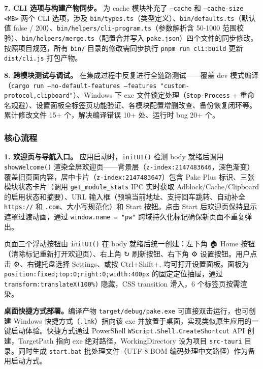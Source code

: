 \documentclass[12pt,a4paper]{ctexart}
\begin{document}
\textbf{7. CLI 选项与构建产物同步。}
为 cache 模块补充了 \texttt{--cache} 和 \texttt{--cache-size <MB>} 两个 CLI 选项，涉及 \texttt{bin/types.ts}（类型定义）、\texttt{bin/defaults.ts}（默认值 false / 200）、\texttt{bin/helpers/cli-program.ts}（参数解析含 50-1000 范围校验）、\texttt{bin/helpers/merge.ts}（配置合并写入 \texttt{pake.json}）四个文件的同步修改。按照项目规范，所有 \texttt{bin/} 目录的修改需同步执行 \texttt{pnpm run cli:build} 更新 \texttt{dist/cli.js} 打包产物。

\textbf{8. 跨模块测试与调试。}
在集成过程中反复进行全链路测试——覆盖 dev 模式编译（\texttt{cargo run --no-default-features --features "custom-protocol,clipboard"}）、Windows 下 exe 文件锁定处理（\texttt{Stop-Process} + 重命名规避）、设置面板全标签页功能验证、各模块配置增删改查、备份恢复闭环等。累计修改文件 15+ 个，解决编译错误 10+ 处、运行时 bug 20+ 个。

\subsubsection{核心流程}

\textbf{1. 欢迎页与导航入口。}
应用启动时，\texttt{initUI()} 检测 body 就绪后调用 \texttt{showWelcome()} 渲染全屏欢迎页——背景层（\texttt{z-index:2147483646}，深色渐变）覆盖旧页面内容，居中卡片（\texttt{z-index:2147483647}）包含 Pake Plus 标识、三张模块状态卡片（调用 \texttt{get\_module\_stats} IPC 实时获取 Adblock/Cache/Clipboard 的启用状态和摘要）、URL 输入框（预填当前地址、支持回车跳转、自动补全 \texttt{https://} 和 \texttt{.com}、大小写规范化）和 Start 按钮。点击 Start 后欢迎页保持显示遮罩过渡动画，通过 \texttt{window.name = "pw"} 跨域持久化标记确保新页面不重复弹出。

页面三个浮动按钮由 \texttt{initUI()} 在 body 就绪后统一创建：左下角 🏠 Home 按钮（清除标记重新打开欢迎页）、右上角 ↻ 刷新按钮、右下角 ⚙ 设置按钮。用户点击 ⚙、右键托盘选择 Settings、或按 Ctrl+Shift+, 均可打开设置面板。面板为 \texttt{position:fixed;top:0;right:0;width:400px} 的固定定位抽屉，通过 \texttt{transform:translateX(100\%)} 隐藏，CSS transition 滑入，6 个标签页按需渲染。

\textbf{桌面快捷方式部署。}编译产物 \texttt{target/debug/pake.exe} 可直接双击运行，也可创建 Windows 快捷方式（\texttt{.lnk}）指向该 exe 并放置于桌面，实现类似原生应用的一键启动体验。快捷方式通过 PowerShell \texttt{WScript.Shell.CreateShortcut} API 创建，TargetPath 指向 exe 绝对路径，WorkingDirectory 设为项目 \texttt{src-tauri} 目录。同时生成 \texttt{start.bat} 批处理文件（UTF-8 BOM 编码处理中文路径）作为备用启动方式。
\end{document}
